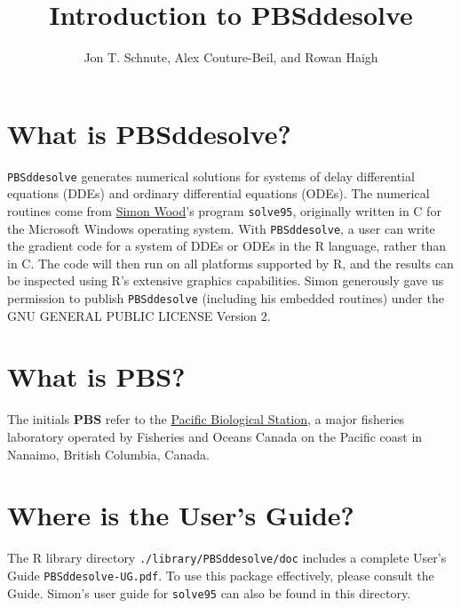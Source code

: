 \documentclass[letter,11pt]{article}
\newcommand{\pbsd}{\texttt{PBSddesolve}}
\newcommand{\pbsm}{\texttt{PBSmodelling}}
\newcommand{\code}[1]{\texttt{#1}}
\newcommand{\bold}[1]{\textbf{#1}}
\newcommand{\red}[1]{{\textcolor{red} {#1}}}
\begin{document}
\title{Introduction to PBSddesolve}
\author{Jon T. Schnute, Alex Couture-Beil, and Rowan Haigh}
\maketitle

\section{What is PBSddesolve?}

\pbsd{} generates numerical solutions for systems of delay differential equations (DDEs) and ordinary differential equations (ODEs).
The numerical routines come from \href{https://people.maths.bris.ac.uk/~sw15190/}{Simon Wood}'s program \code{solve95}, originally written in C for the Microsoft Windows operating system.
With \pbsd{}, a user can write the gradient code for a system of DDEs or ODEs in the R language, rather than in C.
The code will then run on all platforms supported by R, and the results can be inspected using R's extensive graphics capabilities.
Simon generously gave us permission to publish \pbsd{} (including his embedded routines) under the GNU GENERAL PUBLIC LICENSE Version 2.



\section{What is PBS?}

The initials \bold{PBS} refer to the \href{http://www.pac.dfo-mpo.gc.ca/science/facilities-installations/index-eng.html#pbs}{Pacific Biological Station}, a major fisheries laboratory operated by Fisheries and Oceans Canada on the Pacific coast in Nanaimo, British Columbia, Canada.

\section{Where is the User's Guide?}

The R library directory \code{./library/PBSddesolve/doc} includes a complete User's Guide \code{PBSddesolve-UG.pdf}. 
To use this package effectively, please consult the Guide.
Simon's user guide for \code{solve95} can also be found in this directory.
\end{document}
